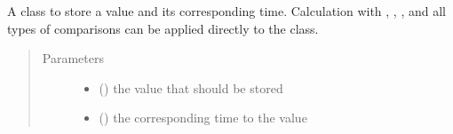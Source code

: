 \documentclass[letterpaper,10pt,english]{sphinxmanual}
\begin{document}
\begin{fulllineitems}
\label{\detokenize{data:lib.data.Data}}
A class to store a value and its corresponding time. Calculation with \sphinxcode{\sphinxupquote{+}}, \sphinxcode{\sphinxupquote{\sphinxhyphen{}}}, \sphinxcode{\sphinxupquote{*}}, \sphinxcode{\sphinxupquote{/}} and all types of
comparisons can be applied directly to the class.
\begin{quote}\begin{description}
\item[{Parameters}] \leavevmode\begin{itemize}
\item {} 
 () \textendash{} the value that should be stored

\item {} 
 () \textendash{} the corresponding time to the value

\end{itemize}

\end{description}\end{quote}

\end{fulllineitems}

\end{document}
